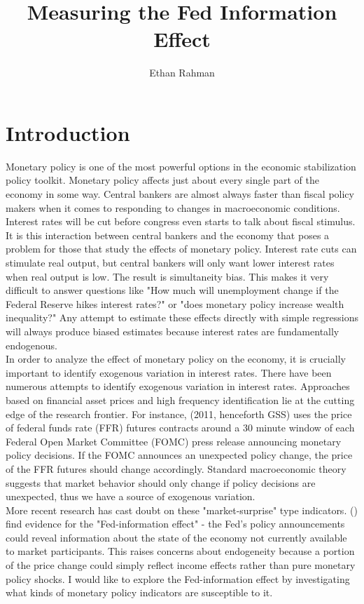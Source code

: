 \documentclass[a4paper,man,floatsintext,natbib]{apa6}
\title{Measuring the Fed Information Effect}
\author{Ethan Rahman}
\affiliation{Northern Illinois University - ECON 592}
\begin{document}
	\maketitle
	\section{Introduction}
	Monetary policy is one of the most powerful options in the economic stabilization policy toolkit. Monetary policy affects just about every single part of the economy in some way. Central bankers are almost always faster than fiscal policy makers when it comes to responding to changes in macroeconomic conditions. Interest rates will be cut before congress even starts to talk about fiscal stimulus. It is this interaction between central bankers and the economy that poses a problem for those that study the effects of monetary policy. Interest rate cuts can stimulate real output, but central bankers will only want lower interest rates when real output is low. The result is simultaneity bias. This makes it very difficult to answer questions like "How much will unemployment change if the Federal Reserve hikes interest rates?" or "does monetary policy increase wealth inequality?" Any attempt to estimate these effects directly with simple regressions will always produce biased estimates because interest rates are fundamentally endogenous.\\
	
	In order to analyze the effect of monetary policy on the economy, it is crucially important to identify exogenous variation in interest rates. There have been numerous attempts to identify exogenous variation in interest rates. Approaches based on financial asset prices and high frequency identification lie at the cutting edge of the research frontier. For instance, \citeauthor{Gurkaynak2011} (2011, henceforth GSS) uses the price of federal funds rate (FFR) futures contracts around a 30 minute window of each Federal Open Market Committee (FOMC) press release announcing monetary policy decisions. If the FOMC announces an unexpected policy change, the price of the FFR futures should change accordingly. Standard macroeconomic theory suggests that market behavior should only change if policy decisions are unexpected, thus we have a source of exogenous variation. \\ 
	
	More recent research has cast doubt on these "market-surprise" type indicators. \citeauthor{Nakamura2018} (\citeyear{Nakamura2018}) find evidence for the "Fed-information effect" - the Fed's policy announcements could reveal information about the state of the economy not currently available to market participants. This raises concerns about endogeneity because a portion of the price change could simply reflect income effects rather than pure monetary policy shocks. I would like to explore the Fed-information effect by investigating what kinds of monetary policy indicators are susceptible to it.
\end{document}
